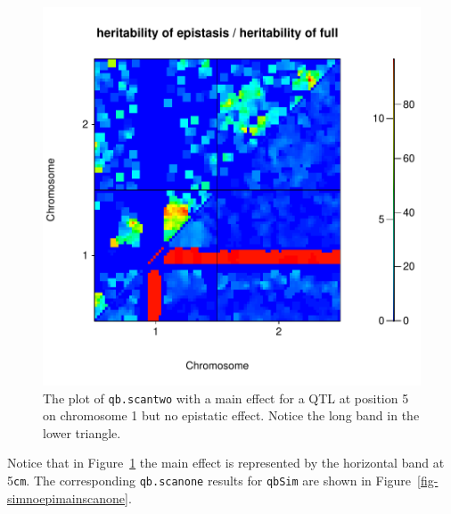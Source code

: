\documentclass[12pt]{article}
\begin{document}
\begin{figure}
\includegraphics{scanPDF/FIG-Scantwo-SimMain}
\caption{The plot of \texttt{qb.scantwo} with a main effect for a QTL
at position 5 on chromosome 1 but no epistatic effect. Notice the long
band in the lower triangle.}
\label{fig-simnoepimain}
\end{figure}
Notice that in Figure~\ref{fig-simnoepimain} the main effect is
represented by the horizontal band at 5{\tt cm}. The corresponding
{\tt qb.scanone} results for {\tt qbSim} are shown in 
Figure~\ref{fig-simnoepimainscanone}.
\end{document}
